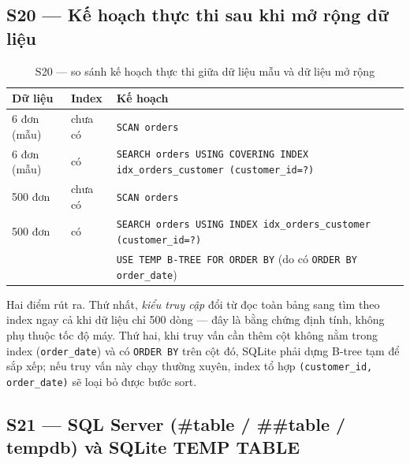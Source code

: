 \documentclass[12pt,a4paper]{article}
\newcommand{\code}[1]{\texttt{\small #1}}
\begin{document}
\subsection{S20 --- Kế hoạch thực thi sau khi mở rộng dữ liệu}

\begin{table}[H]
\centering
\caption{S20 --- so sánh kế hoạch thực thi giữa dữ liệu mẫu và dữ liệu mở rộng}
\label{tab:s20}
\small
\begin{tabularx}{\linewidth}{@{}l l X@{}}
\toprule
\textbf{Dữ liệu} & \textbf{Index} & \textbf{Kế hoạch} \\
\midrule
6 đơn (mẫu)   & chưa có & \code{SCAN orders} \\
6 đơn (mẫu)   & có      & \code{SEARCH orders USING COVERING INDEX idx\_orders\_customer (customer\_id=?)} \\
500 đơn       & chưa có & \code{SCAN orders} \\
500 đơn       & có      & \code{SEARCH orders USING INDEX idx\_orders\_customer (customer\_id=?)} \\
              &         & \code{USE TEMP B-TREE FOR ORDER BY} (do có \code{ORDER BY order\_date}) \\
\bottomrule
\end{tabularx}
\end{table}

Hai điểm rút ra. Thứ nhất, \emph{kiểu truy cập} đổi từ đọc toàn bảng sang tìm theo index ngay cả
khi dữ liệu chỉ 500 dòng --- đây là bằng chứng định tính, không phụ thuộc tốc độ máy. Thứ hai,
khi truy vấn cần thêm cột không nằm trong index (\code{order\_date}) và có \code{ORDER BY} trên
cột đó, SQLite phải dựng B-tree tạm để sắp xếp; nếu truy vấn này chạy thường xuyên, index tổ hợp
\code{(customer\_id, order\_date)} sẽ loại bỏ được bước sort.

\subsection{S21 --- SQL Server (\#table / \#\#table / tempdb) và SQLite TEMP TABLE}
\end{document}
